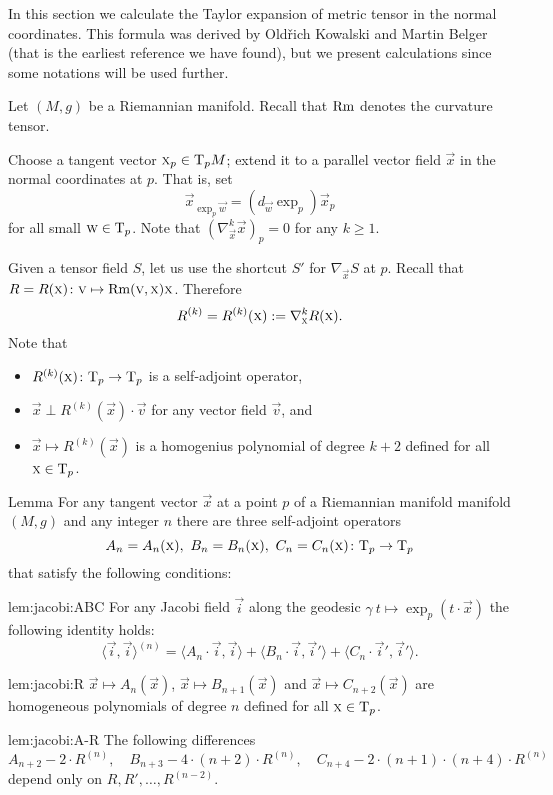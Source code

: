 \documentclass[a4paper,10pt]{article}
\begin{document}
In this section we calculate the Taylor expansion of metric tensor in the normal coordinates.
This formula was derived by Old\v{r}ich Kowalski and Martin Belger \cite[Proposition 2.2]{kowalski-belger} (that is the earliest reference we have found),
but we present calculations since some notations will be used further.

Let $(M,g)$ be a Riemannian manifold.
Recall that $\operatorname{Rm}$ denotes the curvature tensor.

Choose a tangent vector $\text{\sc{x}}_p\in \mathrm{T}_pM$; 
extend it to a parallel vector field $\vec{x}$ in the normal coordinates at $p$.
That is, set 
\[\vec{x}_{\exp_p\vec{w}}=(d_\vec{w}\exp_p)\vec{x}_p\] for all small $\text{\sc{w}}\in \mathrm{T}_p$.
Note that $(\nabla^k_\vec{x} \vec{x})_p=0$ for any $k\ge 1$.

Given a tensor field $S$, let us use the shortcut $S'$  for $\nabla_\vec{x}S$ at $p$.
Recall that $R=R(\text{\sc{x}})\colon\text{\sc{v}}\mapsto \operatorname{Rm}(\text{\sc{v}},\text{\sc{x}})\text{\sc{x}}$.
Therefore
\[R^{(k)}=R^{(k)}(\text{\sc{x}})\mathrel{{:}{=}}\nabla^k_{\text{\sc{x}}}R(\text{\sc{x}}).\]
Note that 
\begin{itemize}
\item $R^{(k)}(\text{\sc{x}})\colon\mathrm{T}_p\to\mathrm{T}_p$ is a self-adjoint operator, 
\item $\vec{x}\perp R^{(k)}(\vec{x})\cdot \vec{v}$ for any vector field $\vec{v}$, and
\item $\vec{x}\mapsto R^{(k)}(\vec{x})$ is a homogenius polynomial of degree $k+2$ defined for all $\text{\sc{x}}\in \mathrm{T}_p$.
\end{itemize}

 


\begin{thm}{Lemma}\label{lem:jacobi}
For any tangent vector $\vec{x}$ at a point $p$ of a Riemannian manifold manifold $(M,g)$ and any integer $n$ there are three self-adjoint operators 
\[A_n=A_n(\vec{x}),\ B_n=B_n(\vec{x}),\ C_n=C_n(\vec{x})\:\T_p\to \T_p\]
that satisfy the following conditions:

\begin{subthm}{lem:jacobi:ABC}
For any Jacobi field $\vec{i}$ along the geodesic $\gamma\:t\mapsto \exp_p(t\cdot \vec{x})$ the following identity holds:
\[\langle \vec{i},\vec{i}\rangle^{(n)}
=
\langle A_n\cdot  \vec{i},\vec{i}\rangle+ \langle B_n\cdot \vec{i}, \vec{i}'\rangle+\langle C_n\cdot \vec{i}', \vec{i}'\rangle.\]
\end{subthm}

\begin{subthm}{lem:jacobi:R}
 $\vec{x}\mapsto A_{n}(\vec{x})$, $\vec{x}\mapsto B_{n+1}(\vec{x})$ and $\vec{x}\mapsto C_{n+2}(\vec{x})$ are homogeneous polynomials of degree $n$ defined for all $\text{\sc{x}}\in \mathrm{T}_p$.
\end{subthm}

\begin{subthm}{lem:jacobi:A-R}
The following differences  
\[A_{n+2}-2\cdot R^{(n)},
\quad 
B_{n+3}-4\cdot(n+2)\cdot R^{(n)},
\quad
C_{n+4}-2\cdot(n+1)\cdot(n+4)\cdot R^{(n)}\]
depend only on $R,R',\dots, R^{(n-2)}$.
\end{subthm}


\end{thm}
\end{document}
